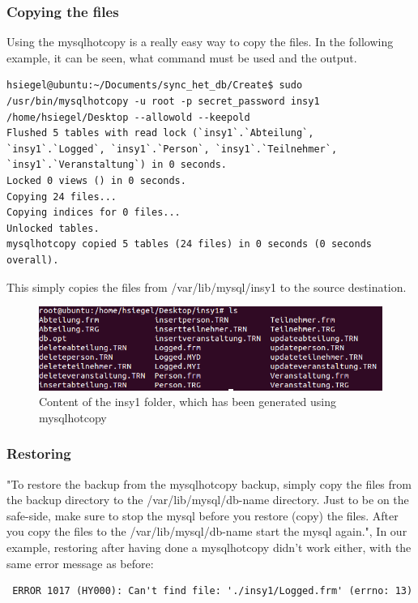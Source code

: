 \documentclass[10pt]{article}
\begin{document}
\subsubsection{Copying the files}
Using the mysqlhotcopy is a really easy way to copy the files. In the following example, it can be seen, what command must be used and the output. \\
\begin{lstlisting}
hsiegel@ubuntu:~/Documents/sync_het_db/Create$ sudo /usr/bin/mysqlhotcopy -u root -p secret_password insy1 /home/hsiegel/Desktop --allowold --keepold
Flushed 5 tables with read lock (`insy1`.`Abteilung`, `insy1`.`Logged`, `insy1`.`Person`, `insy1`.`Teilnehmer`, `insy1`.`Veranstaltung`) in 0 seconds.
Locked 0 views () in 0 seconds.
Copying 24 files...
Copying indices for 0 files...
Unlocked tables.
mysqlhotcopy copied 5 tables (24 files) in 0 seconds (0 seconds overall).
\end{lstlisting}
This simply copies the files from /var/lib/mysql/insy1 to the source destination.
\begin{figure}[!h]
	\begin{center}
		\includegraphics[width=0.8\linewidth]{pictures/lsdesktop}
		\caption{Content of the insy1 folder, which has been generated using mysqlhotcopy}
		\label{content}
	\end{center}
\end{figure}

\subsubsection{Restoring}
"To restore the backup from the mysqlhotcopy backup, simply copy the files from the backup directory to the /var/lib/mysql/{db-name} directory. Just to be on the safe-side, make sure to stop the mysql before you restore (copy) the files. After you copy the files to the /var/lib/mysql/{db-name} start the mysql again.",\cite{mysqlhtcoptut}
In our example, restoring after having done a mysqlhotcopy didn't work either, with the same error message as before:
\begin{lstlisting}
 ERROR 1017 (HY000): Can't find file: './insy1/Logged.frm' (errno: 13)
\end{lstlisting}
\end{document}
